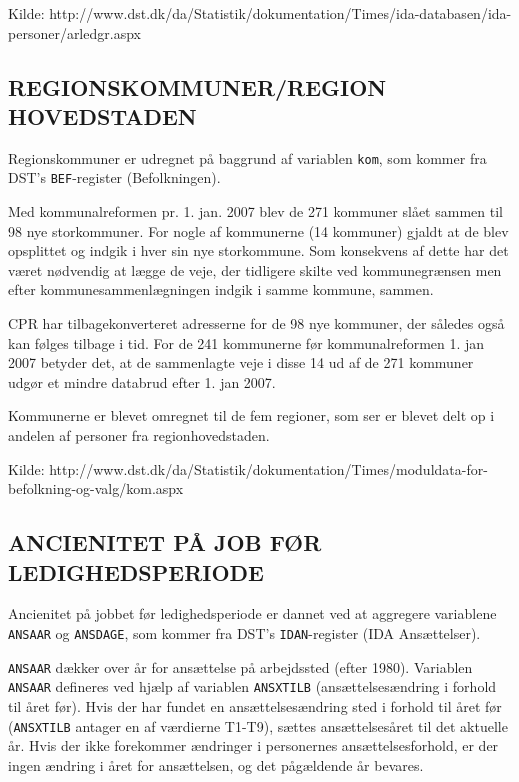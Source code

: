 \begin{itemize} [topsep=6pt,itemsep=-1ex]
Kilde: http://www.dst.dk/da/Statistik/dokumentation/Times/ida-databasen/ida-personer/arledgr.aspx


\subsection{REGIONSKOMMUNER/REGION HOVEDSTADEN \label{}}

Regionskommuner er udregnet på baggrund af variablen \texttt{kom}, som kommer fra DST's \texttt{BEF}-register (Befolkningen).

Med kommunalreformen pr. 1. jan. 2007 blev de 271 kommuner slået sammen til 98 nye storkommuner. For nogle af kommunerne (14 kommuner) gjaldt at de blev opsplittet og indgik i hver sin nye storkommune. Som konsekvens af dette har det været nødvendig at lægge de veje, der tidligere skilte ved kommunegrænsen men efter kommunesammenlægningen indgik i samme kommune, sammen.

CPR har tilbagekonverteret adresserne for de 98 nye kommuner, der således også kan følges tilbage i tid. For de 241 kommunerne før kommunalreformen 1. jan 2007 betyder det, at de sammenlagte veje i disse 14 ud af de 271 kommuner udgør et mindre databrud efter 1. jan 2007.

Kommunerne er blevet omregnet til de fem regioner, som ser er blevet delt op i andelen af personer fra regionhovedstaden.

Kilde: http://www.dst.dk/da/Statistik/dokumentation/Times/moduldata-for-befolkning-og-valg/kom.aspx


\subsection{ANCIENITET PÅ JOB FØR LEDIGHEDSPERIODE \label{}}

Ancienitet på jobbet før ledighedsperiode er dannet ved at aggregere variablene \texttt{ANSAAR} og \texttt{ANSDAGE}, som kommer fra DST's \texttt{IDAN}-register (IDA Ansættelser).

\texttt{ANSAAR} dækker over år for ansættelse på arbejdssted (efter 1980). Variablen \texttt{ANSAAR} defineres ved hjælp af variablen \texttt{ANSXTILB} (ansættelsesændring i forhold til året før). Hvis der har fundet en ansættelsesændring sted i forhold til året før (\texttt{ANSXTILB} antager en af værdierne T1-T9), sættes ansættelsesåret til det aktuelle år. Hvis der ikke forekommer ændringer i personernes ansættelsesforhold, er der ingen ændring i året for ansættelsen, og det pågældende år bevares.


\end{itemize}

